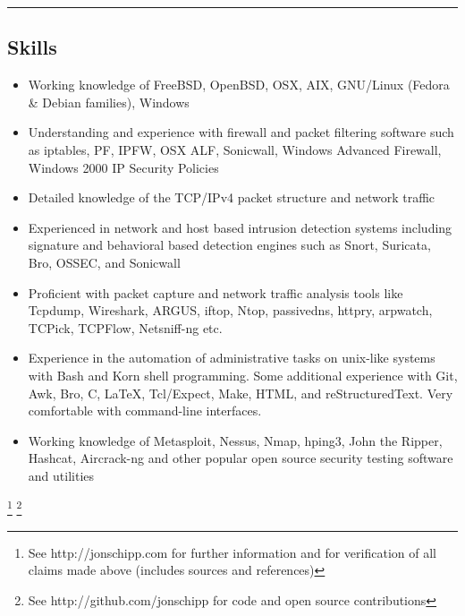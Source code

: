 \documentclass[10pt,letterpaper]{article}
\begin{document}
\newpage

\hrule
\vspace{-0.4em}
\subsection*{Skills}

\begin{itemize}
	\parskip=0.1em

	\item Working knowledge of FreeBSD, OpenBSD, OSX, AIX, GNU/Linux (Fedora \& Debian families), Windows
	\item Understanding and experience with firewall and packet filtering software such as iptables, PF, IPFW, OSX ALF, Sonicwall, Windows Advanced Firewall, Windows 2000 IP Security Policies
	\item Detailed knowledge of the TCP/IPv4 packet structure and network traffic
	\item Experienced in network and host based intrusion detection systems
including signature and behavioral based detection engines such as Snort, Suricata, Bro, OSSEC, and Sonicwall
	\item Proficient with packet capture and network traffic analysis tools like Tcpdump, Wireshark, ARGUS, iftop, Ntop, passivedns, httpry, arpwatch, TCPick, TCPFlow, Netsniff-ng etc.
	\item Experience in the automation of administrative tasks on unix-like
systems with Bash and Korn shell programming. Some additional experience with Git, Awk, Bro, C, \LaTeX, Tcl/Expect, Make, HTML, and reStructuredText. Very comfortable with command-line interfaces.
	\item Working knowledge of Metasploit, Nessus, Nmap, hping3, John the Ripper, Hashcat, Aircrack-ng and other popular open source security testing software and utilities
\end{itemize}

\let\thefootnote\relax\footnote{See http://jonschipp.com for further
information and for verification of all claims made above (includes sources and references)}
\let\thefootnote\relax\footnote{See http://github.com/jonschipp for code and open source contributions}
\end{document}
